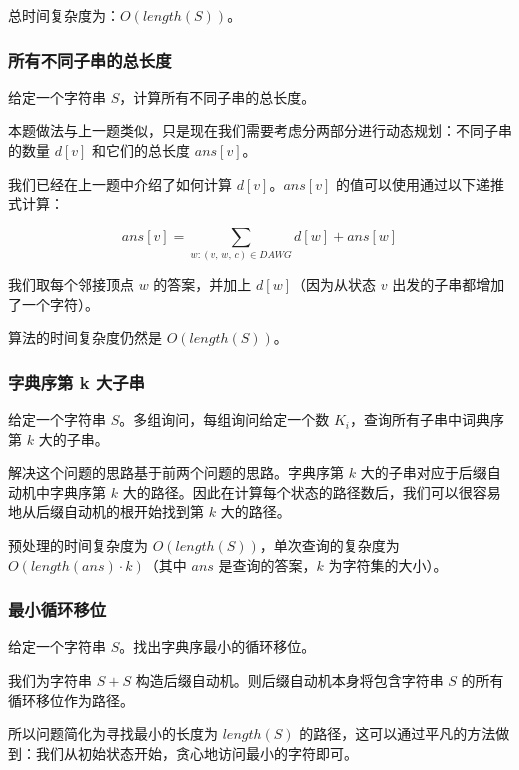 总时间复杂度为：$O(length(S))$。

\subsubsection{所有不同子串的总长度}

\begin{QUOTE}{}{}
给定一个字符串 $S$，计算所有不同子串的总长度。
\end{QUOTE}

本题做法与上一题类似，只是现在我们需要考虑分两部分进行动态规划：不同子串的数量 $d[v]$ 和它们的总长度 $ans[v]$。

我们已经在上一题中介绍了如何计算 $d[v]$。$ans[v]$ 的值可以使用通过以下递推式计算：

$$
ans[v]=\sum_{w:(v,\,w,\,c)\in DAWG}d[w]+ans[w]
$$

我们取每个邻接顶点 $w$ 的答案，并加上 $d[w]$（因为从状态 $v$ 出发的子串都增加了一个字符）。

算法的时间复杂度仍然是 $O(length(S))$。

\subsubsection{字典序第 k 大子串}

\begin{QUOTE}{}{}
给定一个字符串 $S$。多组询问，每组询问给定一个数 $K_i$，查询所有子串中词典序第 $k$ 大的子串。
\end{QUOTE}

解决这个问题的思路基于前两个问题的思路。字典序第 $k$ 大的子串对应于后缀自动机中字典序第 $k$ 大的路径。因此在计算每个状态的路径数后，我们可以很容易地从后缀自动机的根开始找到第 $k$ 大的路径。

预处理的时间复杂度为 $O(length(S))$，单次查询的复杂度为 $O(length(ans)\cdot k)$（其中 $ans$ 是查询的答案，$k$ 为字符集的大小）。

\subsubsection{最小循环移位}

\begin{QUOTE}{}{}
给定一个字符串 $S$。找出字典序最小的循环移位。
\end{QUOTE}

我们为字符串 $S+S$ 构造后缀自动机。则后缀自动机本身将包含字符串 $S$ 的所有循环移位作为路径。

所以问题简化为寻找最小的长度为 $length(S)$ 的路径，这可以通过平凡的方法做到：我们从初始状态开始，贪心地访问最小的字符即可。

